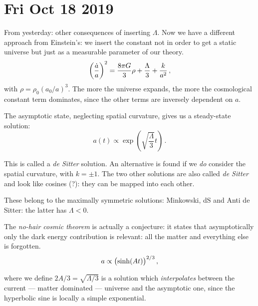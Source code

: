 \documentclass[main.tex]{subfiles}
\begin{document}
\section*{Fri Oct 18 2019}

From yesterday: other consequences of inserting \(\Lambda \).
Now we have a different approach from Einstein's: we insert the constant not in order to get a static universe but just as a measurable parameter of our theory. 
%
\begin{equation}
  \qty(\frac{\dot{a} }{a})^2 = \frac{8 \pi G }{3} \rho +\frac{\Lambda}{3} + \frac{k}{a^2}
\,,
\end{equation}
%
with \(\rho = \rho_0 (a_0 / a)^3\). The more the universe expands, the more the cosmological constant term dominates, since the other terms are inversely dependent on \(a\).

The asymptotic state, neglecting spatial curvature, gives us a steady-state solution: 
%
\begin{equation}
  a(t) \propto \exp(\sqrt{\frac{\Lambda}{3}} t) 
\,.
\end{equation}

This is called a \emph{de Sitter} solution. An alternative is found if we \emph{do} consider the spatial curvature, with \(k = \pm 1\). The two other solutions are also called \emph{de Sitter} and look like cosines (?): they can be mapped into each other.


These belong to the maximally symmetric solutions: Minkowski, dS and Anti de Sitter: the latter has \(\Lambda < 0\).


The \emph{no-hair cosmic theorem} is actually a conjecture: it states that asymptotically only the dark energy contribution is relevant: all the matter and everything else is forgotten. 
%
\begin{equation}
  a \propto \qty(\sinh(At))^{2/3}
\,,
\end{equation}
%

where we define \(2A/3 = \sqrt{\Lambda /3} \) is a solution which \emph{interpolates} between the current --- matter dominated --- universe and the asymptotic one, since the hyperbolic sine is locally a simple exponential.
\end{document}
